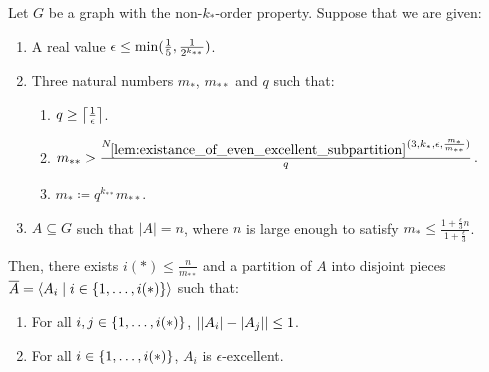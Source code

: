         \begin{lemma} \label{lem:resume_of_all_conditions_for_excellent_partitions}
            Let $G$ be a graph with the non-$k_{*}$-order property.
            Suppose that we are given:
            \begin{enumerate}
                \item A real value $\epsilon \leq \min ( \frac{1}{5}, \frac{1}{2^{k_{**}}} )$.
                \item Three natural numbers $m_*$, $m_{**}$ and $q$ such that:
                    \begin{enumerate}[label=(\alph*), ref=2.\alph*]
                        \item \label{itm:resume_of_all_conditions_for_excellent_partitions.a} $q \geq \left\lceil \frac{1}{\epsilon} \right\rceil$.
                        \item \label{itm:resume_of_all_conditions_for_excellent_partitions.b}
                            $m_{**} > \frac{N_{\ref{lem:existance_of_even_excellent_subpartition}}
                                ( 3, k_*, \epsilon, \frac{m_*}{m_{**}} )}{q}$.
                        \item \label{itm:resume_of_all_conditions_for_excellent_partitions.c} $m_* \coloneqq q^{k_{**}} m_{**}$.
                \end{enumerate}
                \item \label{itm:resume_of_all_conditions_for_excellent_partitions.3}
                    $A \subseteq G$ such that $|A| = n$, where $n$ is large enough to satisfy
                    $m_* \leq \frac{1 + \frac{\epsilon}{3}n}{1 + \frac{\epsilon}{3}}$.
            \end{enumerate}
            Then, there exists $i(*) \leq \frac{n}{m_{**}}$ and a partition of $A$ into disjoint pieces
            $\overline{A} = \left< A_i \mid i \in \{ 1, \dots, i(*) \} \right>$ such that:
            \begin{enumerate}[label=(\roman*), ref=\roman*]
                \item \label{itm:resume_of_all_conditions_for_excellent_partitions.i}
                    For all $i, j \in \{ 1, \dots, i(*) \}$, $| | A_i |- | A_j | | \leq 1$.
                \item \label{itm:resume_of_all_conditions_for_excellent_partitions.ii}
                    For all $i \in \{ 1, \dots, i(*) \}$, $A_i$ is $\epsilon$-excellent.

\end{enumerate}
\end{lemma}
